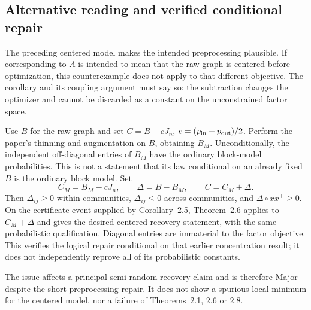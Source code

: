 \documentclass[10pt]{article}
\begin{document}
\subsection*{Alternative reading and verified conditional repair}
The preceding centered model makes the intended preprocessing plausible. If corresponding to \(A\) is intended to mean that the raw graph is centered before optimization, this counterexample does not apply to that different objective. The corollary and its coupling argument must say so: the subtraction changes the optimizer and cannot be discarded as a constant on the unconstrained factor space.\par
Use \(B\) for the raw graph and set \(C=B-cJ_n\), \(c=(p_{\rm in}+p_{\rm out})/2\). Perform the paper’s thinning and augmentation on \(B\), obtaining \(B_M\). Unconditionally, the independent off-diagonal entries of \(B_M\) have the ordinary block-model probabilities. This is not a statement that its law conditional on an already fixed \(B\) is the ordinary block model. Set \[C_M=B_M-cJ_n,\qquad \Delta=B-B_M,\qquad C=C_M+\Delta.\] Then \(\Delta_{ij}\ge0\) within communities, \(\Delta_{ij}\le0\) across communities, and \(\Delta\circ xx^\top\ge0\). On the certificate event supplied by Corollary 2.5, Theorem 2.6 applies to \(C_M+\Delta\) and gives the desired centered recovery statement, with the same probabilistic qualification. Diagonal entries are immaterial to the factor objective. This verifies the logical repair conditional on that earlier concentration result; it does not independently reprove all of its probabilistic constants.\par
The issue affects a principal semi-random recovery claim and is therefore Major despite the short preprocessing repair. It does not show a spurious local minimum for the centered model, nor a failure of Theorems 2.1, 2.6 or 2.8.\par
\end{document}
